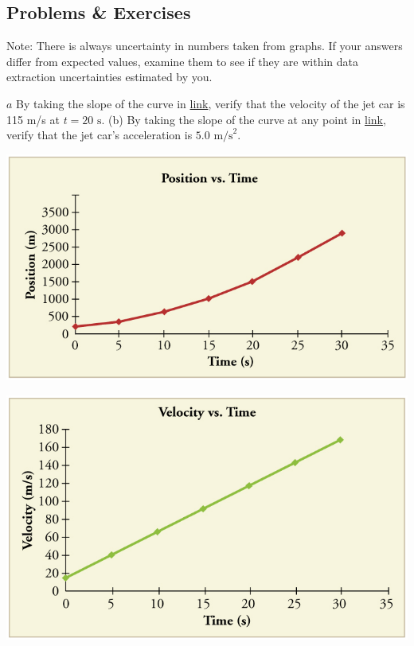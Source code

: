 \documentclass[
]{book}
\newenvironment{problems-exercises}{}{}
\begin{document}
\hypertarget{fs-id1987308}{}
\begin{problems-exercises}

\hypertarget{problems-exercises-5}{%
\subsection{Problems \& Exercises}\label{problems-exercises-5}}

Note: There is always uncertainty in numbers taken from graphs. If your
answers differ from expected values, examine them to see if they are
within data extraction uncertainties estimated by you.

\hypertarget{fs-id4088406}{}
\leavevmode\hypertarget{fs-id4088408}{}%
\(a\) By taking the slope of the curve in
\protect\hyperlink{import-auto-id1798398}{link}, verify that the
velocity of the jet car is 115 m/s at \({t = \text{20\ s}}{}\). (b) By
taking the slope of the curve at any point in
\protect\hyperlink{import-auto-id4101417}{link}, verify that the
jet car's acceleration is \({5\text{.}\text{0\ m/s}^{2}}{}\).

\includegraphics{images/Figure_02_08Sol_11.jpg}

\includegraphics{images/Figure_02_08Sol_12.jpg}


\end{problems-exercises}
\end{document}
